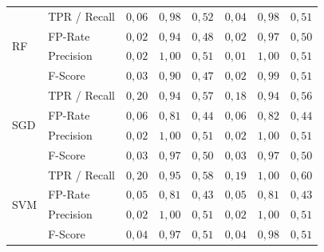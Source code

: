 \begin{table}[h!t]
{\begin{tabular}{|ll|rrr|rrr|}
\hline
\multirow{4}{*}{RF}  & TPR / Recall & $0,06$             & $0,98$                 & $0,52$                     & $0,04$             & $0,98$                 & $0,51$                      \\
                     & FP-Rate      & $0,02$             & $0,94$                 & $0,48$                     & $0,02$             & $0,97$                 & $0,50$                      \\
                     & Precision    & $0,02$             & $1,00$                 & $0,51$                     & $0,01$             & $1,00$                 & $0,51$                      \\
                     & F-Score      & $0,03$             & $0,90$                 & $0,47$                     & $0,02$             & $0,99$                 & $0,51$                      \\ 
\hline
\multirow{4}{*}{SGD} & TPR / Recall & $0,20$             & $0,94$                 & $0,57$                     & $0,18$             & $0,94$                 & $0,56$                      \\
                     & FP-Rate      & $0,06$             & $0,81$                 & $0,44$                     & $0,06$             & $0,82$                 & $0,44$                      \\
                     & Precision    & $0,02$             & $1,00$                 & $0,51$                     & $0,02$             & $1,00$                 & $0,51$                      \\
                     & F-Score      & $0,03$             & $0,97$                 & $0,50$                     & $0,03$             & $0,97$                 & $0,50$                      \\ 
\hline
\multirow{4}{*}{SVM} & TPR / Recall & $0,20$             & $0,95$                 & $0,58$                     & $0,19$             & $1,00$                 & $0,60$                      \\
                     & FP-Rate      & $0,05$             & $0,81$                 & $0,43$                     & $0,05$             & $0,81$                 & $0,43$                      \\
                     & Precision    & $0,02$             & $1,00$                 & $0,51$                     & $0,02$             & $1,00$                 & $0,51$                      \\
                     & F-Score      & $0,04$             & $0,97$                 & $0,51$                     & $0,04$             & $0,98$                 & $0,51$                      \\
\hline
\end{tabular}
}
\end{table}


